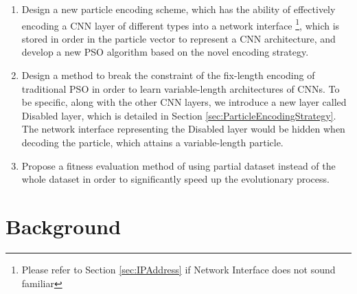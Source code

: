 \documentclass[conference]{IEEEtran}
\begin{document}
\begin{enumerate}
	\item Design a new particle encoding scheme, which has the ability of effectively encoding a CNN layer of different types into a network interface \footnote{Please refer to Section \ref{sec:IPAddress} if Network Interface does not sound familiar}, which is stored in order in the particle vector to represent a CNN architecture, and develop a new PSO algorithm based on the novel encoding strategy. 
	\item Design a method to break the constraint of the fix-length encoding of traditional PSO in order to learn variable-length architectures of CNNs. To be specific, along with the other CNN layers, we introduce a new layer called Disabled layer, which is detailed in Section \ref{sec:ParticleEncodingStrategy}. The network interface representing the Disabled layer would be hidden when decoding the particle, which attains a variable-length particle.
	\item Propose a fitness evaluation method of using partial dataset instead of the whole dataset in order to significantly speed up the evolutionary process. 
\end{enumerate} 



\section{Background}\label{sec:Background}
\end{document}
